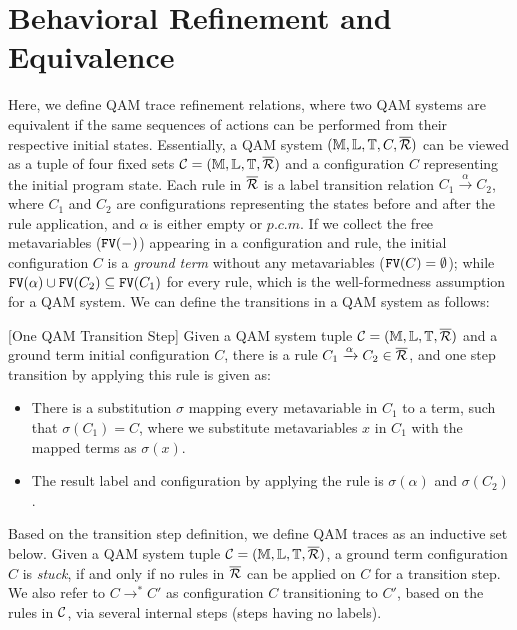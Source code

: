 \section{Behavioral Refinement and Equivalence} \label{sec:refinement}

Here, we define QAM trace refinement relations, where two QAM systems are equivalent if the same sequences of actions can be performed
from their respective initial states.
Essentially, a QAM system $(\mathbb{M},\mathbb{L},\mathbb{T},C,\overline{\mathcal{R}})$
can be viewed as a tuple of four fixed sets $\mathcal{C}=(\mathbb{M},\mathbb{L},\mathbb{T},\overline{\mathcal{R}})$
and a configuration $C$ representing the initial program state.
Each rule in $\overline{\mathcal{R}}$ is a label transition relation $C_1 \xrightarrow{\alpha} C_2$,
where $C_1$ and $C_2$ are configurations representing the states
before and after the rule application, and $\alpha$ is either empty or $p.c.m$.
If we collect the free metavariables ($\texttt{FV}(-)$) appearing in a configuration and rule, 
the initial configuration $C$ is a \textit{ground term} without any metavariables ($\texttt{FV}(C)=\emptyset$);
while $\texttt{FV}(\alpha) \cup \texttt{FV}(C_2)\subseteq \texttt{FV}(C_1)$ for every rule, which is the well-formedness assumption for a QAM system.
We can define the transitions in a QAM system as follows:

\begin{definition}\label{def:labeledsystem}\rm[One QAM Transition Step]
Given a QAM system tuple $\mathcal{C}=(\mathbb{M},\mathbb{L},\mathbb{T},\overline{\mathcal{R}})$ and a ground term initial configuration $C$, there is a rule $C_1 \xrightarrow{\alpha} C_2 \in \overline{\mathcal{R}}$, and one step transition by applying this rule is given as:
\begin{itemize}
\item There is a substitution $\sigma$ mapping every metavariable in $C_1$ to a term, such that $\sigma(C_1)=C$, where we substitute metavariables $x$ in $C_1$ with the mapped terms as $\sigma(x)$.
\item The result label and configuration by applying the rule is $\sigma(\alpha)$ and $\sigma(C_2)$.
\end{itemize}
\end{definition}

Based on the transition step definition, we define QAM traces as an inductive set below. Given a QAM system tuple $\mathcal{C}=(\mathbb{M},\mathbb{L},\mathbb{T},\overline{\mathcal{R}})$, a ground term configuration $C$ is \textit{stuck}, if and only if no rules in $\overline{\mathcal{R}}$ can be applied on $C$ for a transition step. We also refer to $C \longrightarrow^* C'$ as configuration $C$ transitioning to $C'$, based on the rules in $\mathcal{C}$, via several internal steps (steps having no labels).

